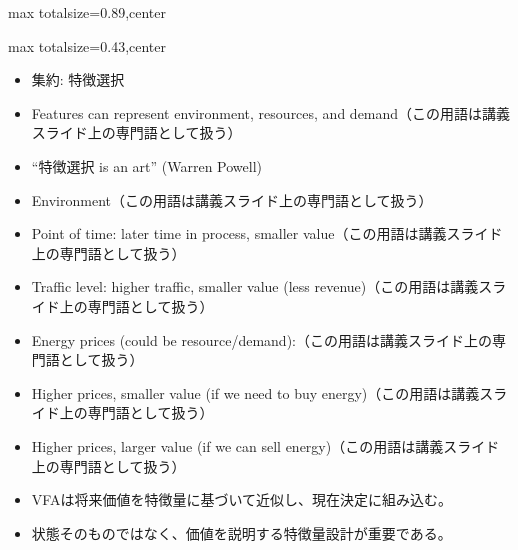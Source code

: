 \begin{minipage}[t]{0.58\textwidth}
\begin{adjustbox}{max totalsize={\textwidth}{0.89\textheight},center}
\begin{minipage}{\textwidth}
\end{minipage}
\end{adjustbox}
\end{minipage}


\clearpage
{}
\begin{minipage}[t]{0.405\textwidth}
\begin{adjustbox}{max totalsize={\textwidth}{0.43\textheight},center}
\begin{minipage}{\textwidth}\scriptsize
{}\begin{itemize}
\item 集約: 特徴選択
\item Features can represent environment, resources, and demand（この用語は講義スライド上の専門語として扱う）
\item “特徴選択 is an art” (Warren Powell)
\item Environment（この用語は講義スライド上の専門語として扱う）
\item Point of time: later time in process, smaller value（この用語は講義スライド上の専門語として扱う）
\item Traffic level: higher traffic, smaller value (less revenue)（この用語は講義スライド上の専門語として扱う）
\item Energy prices (could be resource/demand):（この用語は講義スライド上の専門語として扱う）
\item Higher prices, smaller value (if we need to buy energy)（この用語は講義スライド上の専門語として扱う）
\item Higher prices, larger value (if we can sell energy)（この用語は講義スライド上の専門語として扱う）
\end{itemize}\begin{itemize}
\item VFAは将来価値を特徴量に基づいて近似し、現在決定に組み込む。
\item 状態そのものではなく、価値を説明する特徴量設計が重要である。
\end{itemize}
\end{minipage}
\end{adjustbox}
\end{minipage}\hfill
